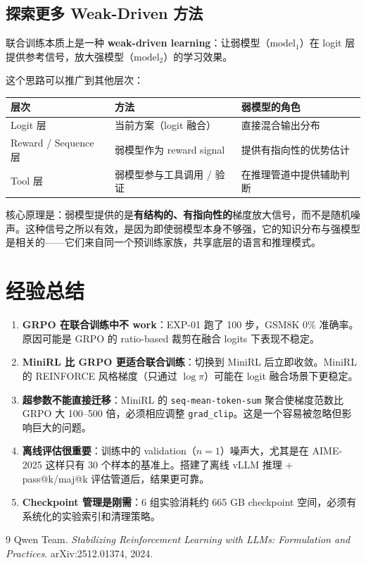 \documentclass[11pt,a4paper]{article}
\begin{document}
\subsection{探索更多 Weak-Driven 方法}

联合训练本质上是一种 \textbf{weak-driven learning}：让弱模型（$\text{model}_1$）在 logit 层提供参考信号，放大强模型（$\text{model}_2$）的学习效果。

这个思路可以推广到其他层次：

\begin{table}[h]
\centering
\begin{tabular}{lll}
\toprule
\textbf{层次} & \textbf{方法} & \textbf{弱模型的角色} \\
\midrule
Logit 层 & 当前方案（logit 融合） & 直接混合输出分布 \\
Reward / Sequence 层 & 弱模型作为 reward signal & 提供有指向性的优势估计 \\
Tool 层 & 弱模型参与工具调用 / 验证 & 在推理管道中提供辅助判断 \\
\bottomrule
\end{tabular}
\end{table}

核心原理是：弱模型提供的是\textbf{有结构的、有指向性的}梯度放大信号，而不是随机噪声。这种信号之所以有效，是因为即使弱模型本身不够强，它的知识分布与强模型是相关的——它们来自同一个预训练家族，共享底层的语言和推理模式。

\section{经验总结}

\begin{enumerate}[nosep]
    \item \textbf{GRPO 在联合训练中不 work}：EXP-01 跑了 100 步，GSM8K 0\% 准确率。原因可能是 GRPO 的 ratio-based 裁剪在融合 logits 下表现不稳定。
    \item \textbf{MiniRL 比 GRPO 更适合联合训练}：切换到 MiniRL 后立即收敛。MiniRL 的 REINFORCE 风格梯度（只通过 $\log \pi$）可能在 logit 融合场景下更稳定。
    \item \textbf{超参数不能直接迁移}：MiniRL 的 \texttt{seq-mean-token-sum} 聚合使梯度范数比 GRPO 大 100--500 倍，必须相应调整 \texttt{grad\_clip}。这是一个容易被忽略但影响巨大的问题。
    \item \textbf{离线评估很重要}：训练中的 validation（$n=1$）噪声大，尤其是在 AIME-2025 这样只有 30 个样本的基准上。搭建了离线 vLLM 推理 + pass@k/maj@k 评估管道后，结果更可靠。
    \item \textbf{Checkpoint 管理是刚需}：6 组实验消耗约 665 GB checkpoint 空间，必须有系统化的实验索引和清理策略。
\end{enumerate}

\begin{thebibliography}{9}
Qwen Team.
\textit{Stabilizing Reinforcement Learning with LLMs: Formulation and Practices}.
arXiv:2512.01374, 2024.
\end{thebibliography}
\end{document}
